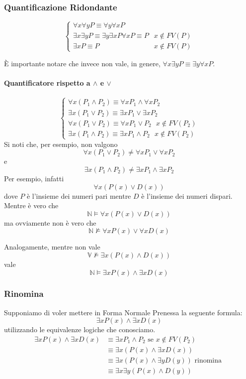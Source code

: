 \subsubsection{Quantificazione Ridondante}
$$
\begin{cases}
        \forall x \forall y P  \equiv \forall y \forall x P \\
        \exists x \exists y P  \equiv \exists y \exists x P
        \forall x P \equiv P  &  x \notin FV(P)\\
        \exists x P \equiv P  & x \notin FV(P)
\end{cases}
$$

\`E importante notare che invece non vale, in genere, $\forall x \exists y P \equiv \exists y \forall x P$.  


\paragraph{Quantificatore rispetto a $\land$ e $\lor$}
$$
\begin{cases}
        \forall x (P_1 \land P_2) \equiv \forall x P_1 \land \forall x P_2 \\
        \exists x (P_1 \lor P_2) \equiv \exists x P_1 \lor \exists x P_2 \\
        \forall x (P_1 \lor P_2) \equiv \forall x P_1 \lor P_2 ~ ~ ~ x \notin FV(P_2) \\
        \exists x (P_1 \land P_2) \equiv \exists x P_1 \land P_2 ~ ~ ~ x \notin FV(P_2)
\end{cases}
$$
Si noti che, per esempio, non valgono
$$
\forall x (P_1 \lor P_2) \neq \forall x P_1 \lor \forall x P_2
$$
e 
$$
\exists x (P_1 \land P_2) \neq \exists x P_1 \land \exists x P_2
$$
Per esempio, infatti 
$$
\forall x (P(x) \lor D(x))
$$
dove $P$ è l'insieme dei numeri pari mentre $D$ è l'insieme dei numeri dispari. 
Mentre è vero che 
$$
\mathbb{N} \models \forall x (P(x) \lor D(x))
$$
ma ovviamente non è vero che
$$
\mathbb{N} \nvDash \forall x P(x) \lor \forall x D(x)
$$

Analogamente, mentre non vale 
$$
\mathbb{V} \nvDash \exists x (P(x) \land D(x))
$$
vale 
$$
\mathbb{N} \models \exists x P(x) \land \exists x D(x)
$$
\subsubsection{Rinomina}
Supponiamo di voler mettere in Forma Normale Prenessa la seguente formula: 
$$
\exists x P(x) \land \exists x D(x)
$$
utilizzando le equivalenze logiche che conosciamo. 
\begin{align*}
        \exists x P(x) \land \exists x D(x) &\equiv \exists x P_1 \land P_2 \text{ se } x \notin FV(P_2) \\
                                            &\equiv \exists x (P(x) \land \exists x D(x))\\
                                            &\equiv \exists x (P(x) \land \exists y D(y)) \text{ rinomina }\\
                                            &\equiv \exists x \exists y (P(x) \land D(y))
\end{align*}

